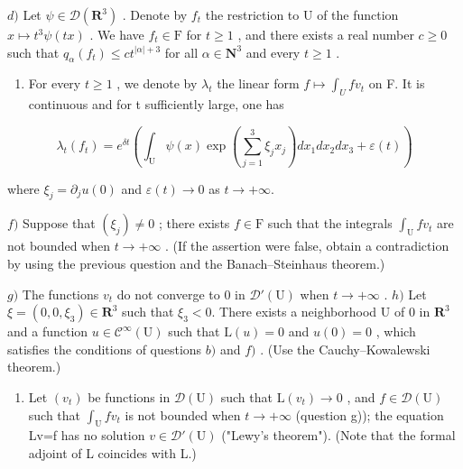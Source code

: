 \(d)\) Let \(\psi\in\mathcal{D}(\mathbf{R}^{3})\) . Denote by \(f_{t}\) the restriction to U of the function \(x\mapsto t^{3}\psi(tx)\) . We have \(f_{t}\in\mathrm{F}\) for \(t\geqslant1\) , and there exists a real number \(c\geqslant0\) such that \(q_{\alpha}(f_{t})\leqslant ct^{|\alpha|+3}\) for all \(\alpha\in\mathbf{N}^{3}\) and every \(t\geqslant1\) .

\begin{enumerate}
\def\labelenumi{\alph{enumi})}
\setcounter{enumi}{4}
\tightlist
\item
  For every \(t \geqslant 1\) , we denote by \(\lambda_{t}\) the linear form \(f \mapsto \int_{U} fv_{t}\) on F. It is continuous and for t sufficiently large, one has
\end{enumerate}

\[
\lambda_ {t} (f _ {t}) = e ^ {\delta t} \left(\int_ {\mathrm{U}} \psi (x) \exp \left(\sum_ {j = 1} ^ {3} \xi_ {j} x _ {j}\right) d x _ {1} d x _ {2} d x _ {3} + \varepsilon (t)\right)
\]

where \(\xi_{j} = \partial_{j}u(0)\) and \(\varepsilon (t)\to 0\) as \(t\rightarrow +\infty\).

\(f)\) Suppose that \((\xi_j) \neq 0\) ; there exists \(f \in \mathrm{F}\) such that the integrals \(\int_{\mathrm{U}} f v_t\) are not bounded when \(t \to +\infty\) . (If the assertion were false, obtain a contradiction by using the previous question and the Banach–Steinhaus theorem.)

\(g)\) The functions \(v_{t}\) do not converge to 0 in \(\mathcal{D}'(\mathrm{U})\) when \(t\to+\infty\) . \(h)\) Let \(\xi=(0,0,\xi_{3})\in\mathbf{R}^{3}\) such that \(\xi_{3}<0\). There exists a neighborhood U of 0 in \(\mathbf{R}^{3}\) and a function \(u\in\mathcal{C}^{\infty}(\mathrm{U})\) such that \(\mathrm{L}(u)=0\) and \(u(0)=0\) , which satisfies the conditions of questions \(b)\) and \(f)\) . (Use the Cauchy–Kowalewski theorem.)

\begin{enumerate}
\def\labelenumi{\roman{enumi})}
\tightlist
\item
  Let \((v_{t})\) be functions in \(\mathcal{D}(\mathrm{U})\) such that \(\mathrm{L}(v_{t})\to0\) , and \(f\in\mathcal{D}(\mathrm{U})\) such that \(\int_{\mathrm{U}}fv_{t}\) is not bounded when \(t\to+\infty\) (question g)); the equation Lv=f has no solution \(v\in\mathcal{D}'(\mathrm{U})\) ("Lewy's theorem"). (Note that the formal adjoint of L coincides with L.)
\end{enumerate}

